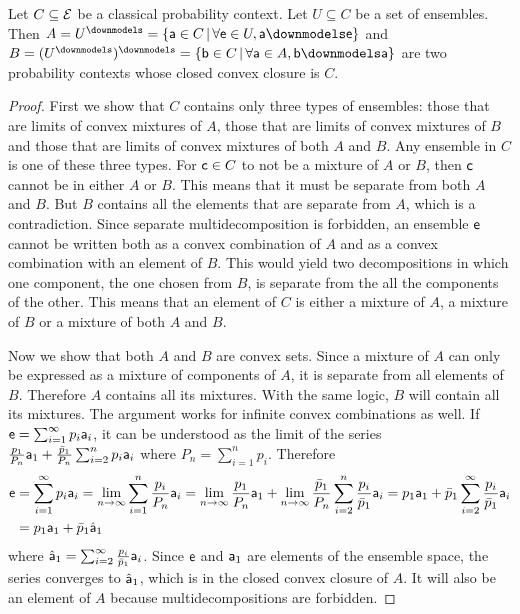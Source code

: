 \begin{prop}
	Let $C \subseteq \Ens$ be a classical probability context. Let $U \subseteq C$ be a set of ensembles. Then $A=U^\separate=\{ \ens[a] \in C \, | \, \forall \ens \in U, \ens[a] \separate \ens \}$ and $B=(U^\separate)^\separate=\{ \ens[b] \in C \, | \, \forall \ens[a] \in A, \ens[b] \separate \ens[a] \}$ are two probability contexts whose closed convex closure is $C$.
\end{prop}

\begin{proof}
	First we show that $C$ contains only three types of ensembles: those that are limits of convex mixtures of $A$, those that are limits of convex mixtures of $B$ and those that are limits of convex mixtures of both $A$ and $B$. Any ensemble in $C$ is one of these three types. For $\ens[c] \in C$ to not be a mixture of $A$ or $B$, then $\ens[c]$ cannot be in either $A$ or $B$. This means that it must be separate from both $A$ and $B$. But $B$ contains all the elements that are separate from $A$, which is a contradiction. Since separate multidecomposition is forbidden, an ensemble $\ens$ cannot be written both as a convex combination of $A$ and as a convex combination with an element of $B$. This would yield two decompositions in which one component, the one chosen from $B$, is separate from the all the components of the other. This means that an element of $C$ is either a mixture of $A$, a mixture of $B$ or a mixture of both $A$ and $B$.
	
	Now we show that both $A$ and $B$ are convex sets. Since a mixture of $A$ can only be expressed as a mixture of components of $A$, it is separate from all elements of $B$. Therefore $A$ contains all its mixtures. With the same logic, $B$ will contain all its mixtures. The argument works for infinite convex combinations as well. If $\ens = \sum_{i=1}^{\infty} p_i \ens[a]_i$, it can be understood as the limit of the series $\frac{p_1}{P_n} \ens[a]_1 + \frac{\bar{p}_1}{P_n} \sum_{i=2}^{n} p_i \ens[a]_i$ where $P_n = \sum_{i=1}^{n} p_i$. Therefore
	\begin{equation}
		\begin{aligned}
			\ens &= \sum_{i=1}^{\infty} p_i \ens[a]_i = \lim\limits_{n \to \infty}  \sum_{i=1}^{n} \frac{p_i}{P_n} \ens[a]_i = \lim\limits_{n \to \infty} \frac{p_1}{P_n} \ens[a]_1 + \lim\limits_{n \to \infty}\frac{\bar{p}_1}{P_n} \sum_{i=2}^{n} \frac{p_i}{\bar{p}_1} \ens[a]_i = p_1 \ens[a]_1 + \bar{p}_1 \sum_{i=2}^{\infty} \frac{p_i}{\bar{p}_1} \ens[a]_i \\
			&= p_1 \ens[a]_1 + \bar{p}_1 \hat{\ens[a]}_1
		\end{aligned}
	\end{equation}
	where $\hat{\ens[a]}_1 = \sum_{i=2}^{\infty} \frac{p_i}{\bar{p}_1} \ens[a]_i$. Since $\ens$ and $\ens[a]_1$ are elements of the ensemble space, the series converges to $\hat{\ens[a]}_1$, which is in the closed convex closure of $A$. It will also be an element of $A$ because multidecompositions are forbidden.
	

\end{proof}
